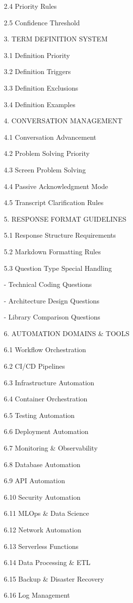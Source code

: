 \documentclass[11pt,a4paper]{article}
\begin{document}
   2.4 Priority Rules

   2.5 Confidence Threshold

3. TERM DEFINITION SYSTEM

   3.1 Definition Priority

   3.2 Definition Triggers

   3.3 Definition Exclusions

   3.4 Definition Examples

4. CONVERSATION MANAGEMENT

   4.1 Conversation Advancement

   4.2 Problem Solving Priority

   4.3 Screen Problem Solving

   4.4 Passive Acknowledgment Mode

   4.5 Transcript Clarification Rules

5. RESPONSE FORMAT GUIDELINES

   5.1 Response Structure Requirements

   5.2 Markdown Formatting Rules

   5.3 Question Type Special Handling

       - Technical Coding Questions

       - Architecture Design Questions

       - Library Comparison Questions

6. AUTOMATION DOMAINS \& TOOLS

   6.1 Workflow Orchestration

   6.2 CI/CD Pipelines

   6.3 Infrastructure Automation

   6.4 Container Orchestration

   6.5 Testing Automation

   6.6 Deployment Automation

   6.7 Monitoring \& Observability

   6.8 Database Automation

   6.9 API Automation

   6.10 Security Automation

   6.11 MLOps \& Data Science

   6.12 Network Automation

   6.13 Serverless Functions

   6.14 Data Processing \& ETL

   6.15 Backup \& Disaster Recovery

   6.16 Log Management
\end{document}
